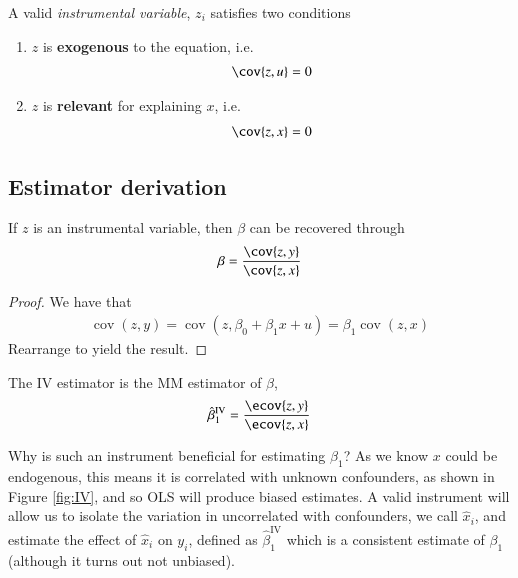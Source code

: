             \begin{definition}[IV]
                A valid \textit{instrumental variable}, $z_i$ satisfies two conditions
                \begin{enumerate}
                    \item $z$ is \textbf{exogenous} to the equation, i.e. 
                    \begin{align}
                        \cov{z,u} = 0
                    \end{align}
                    \item $z$ is \textbf{relevant} for explaining $x$, i.e.
                    \begin{align}
                        \cov{z,x} = 0
                    \end{align}
                \end{enumerate}
            \end{definition}

        \subsection{Estimator derivation}
            \begin{theorem}
                If $z$ is an instrumental variable, then $\beta$ can be recovered through
                \begin{align}
                    \beta = \frac{\cov{z,y}}{\cov{z,x}}
                \end{align}
            \end{theorem}
            \begin{proof}
                We have that
                \begin{align}
                    \operatorname{cov}(z,y)= \operatorname{cov}(z,\beta_0 +\beta_1 x +u ) = \beta_1\operatorname{cov}(z, x)
                \end{align}
                Rearrange to yield the result.
            \end{proof}
            \begin{definition}[IV estimator]
                The IV estimator is the MM estimator of $\beta$,
                \begin{align}
                    \hat\beta^\mathrm{IV}_1 = \frac{\ecov{z,y}}{\ecov{z,x}}
                \end{align}
            \end{definition}
            Why is such an instrument beneficial for estimating $\beta_1$? As we know $x$ could be endogenous, this means it is correlated with unknown confounders, as shown in Figure \ref{fig:IV}, and so OLS will produce biased estimates. A valid instrument will allow us to isolate the variation in  uncorrelated with confounders, we call $\hat x_i$, and estimate the effect of $\hat x_i$ on $y_i$, defined as $\hat\beta^\mathrm{IV}_1$ which is a consistent estimate of $\beta_1$ (although it turns out not unbiased).

